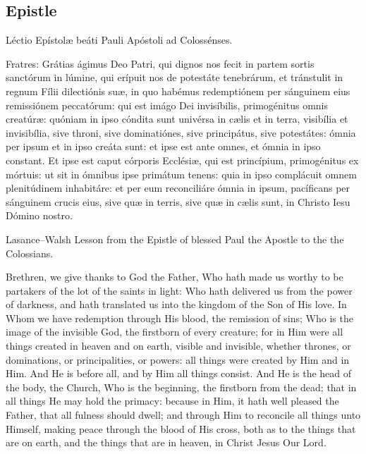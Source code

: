 \subsection{Epistle}
\label{proper-epistle}
\begin{latinproper}
Léctio Epístolæ beáti Pauli Apóstoli ad Colossénses.

Fratres: Grátias ágimus Deo Patri, qui dignos nos fecit in partem sortis sanctórum in lúmine, qui erípuit nos de potestáte tenebrárum, et tránstulit in regnum Fílii dilectiónis suæ, in quo habémus redemptiónem per sánguinem eius remissiónem peccatórum: qui est imágo Dei invisíbilis, primogénitus omnis creatúræ: quóniam in ipso cóndita sunt univérsa in cælis et in terra, visibília et invisibília, sive throni, sive dominatiónes, sive principátus, sive potestátes: ómnia per ipsum et in ipso creáta sunt: et ipse est ante omnes, et ómnia in ipso constant. Et ipse est caput córporis Ecclésiæ, qui est princípium, primogénitus ex mórtuis: ut sit in ómnibus ipse primátum tenens: quia in ipso complácuit omnem plenitúdinem inhabitáre: et per eum reconciliáre ómnia in ipsum, pacíficans per sánguinem crucis eius, sive quæ in terris, sive quæ in cælis sunt, in Christo Iesu Dómino nostro.
\end{latinproper}
\begin{englishwitness}{Lasance--Walsh}
Lesson from the Epistle of blessed Paul the Apostle to the the Colossians.

Brethren, we give thanks to God the Father, Who hath made us worthy to be partakers of the lot of the saints in light: Who hath delivered us from the power of darkness, and hath translated us into the kingdom of the Son of His love. In Whom we have redemption through His blood, the remission of sins; Who is the image of the invisible God, the firstborn of every creature; for in Him were all things created in heaven and on earth, visible and invisible, whether thrones, or dominations, or principalities, or powers: all things were created by Him and in Him. And He is before all, and by Him all things consist. And He is the head of the body, the Church, Who is the beginning, the firstborn from the dead; that in all things He may hold the primacy: because in Him, it hath well pleased the Father, that all fulness should dwell; and through Him to reconcile all things unto Himself, making peace through the blood of His cross, both as to the things that are on earth, and the things that are in heaven, in Christ Jesus Our Lord.
\end{englishwitness}
